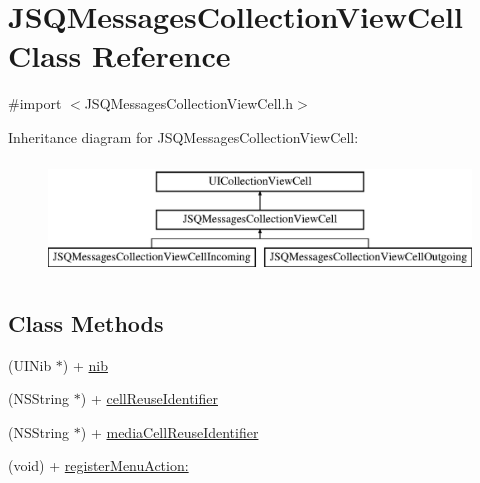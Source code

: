 \hypertarget{interface_j_s_q_messages_collection_view_cell}{}\section{J\+S\+Q\+Messages\+Collection\+View\+Cell Class Reference}
\label{interface_j_s_q_messages_collection_view_cell}


{\ttfamily \#import $<$J\+S\+Q\+Messages\+Collection\+View\+Cell.\+h$>$}

Inheritance diagram for J\+S\+Q\+Messages\+Collection\+View\+Cell\+:\begin{figure}[H]
\begin{center}
\leavevmode
\includegraphics[height=3.000000cm]{interface_j_s_q_messages_collection_view_cell}
\end{center}
\end{figure}
\subsection*{Class Methods}
\begin{DoxyCompactItemize}
\item 
(U\+I\+Nib $\ast$) + \hyperlink{interface_j_s_q_messages_collection_view_cell_aaa9d7b27429f84b2fd893033ab115c8f}{nib}
\item 
(N\+S\+String $\ast$) + \hyperlink{interface_j_s_q_messages_collection_view_cell_a00c74350ff61f69a5cba4b2f4d54b22b}{cell\+Reuse\+Identifier}
\item 
(N\+S\+String $\ast$) + \hyperlink{interface_j_s_q_messages_collection_view_cell_aecfdef4a089939052879052f6613c703}{media\+Cell\+Reuse\+Identifier}
\item 
(void) + \hyperlink{interface_j_s_q_messages_collection_view_cell_aa64ca6a7dc551521571da824faf2ac46}{register\+Menu\+Action\+:}
\end{DoxyCompactItemize}
